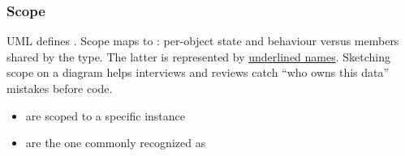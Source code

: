     \subsubsection{Scope}
    UML defines .
    \newline
    Scope maps to : per-object state and behaviour versus members shared by the type.
    The latter is represented by \underline{underlined names}.
    Sketching scope on a diagram helps interviews and reviews catch ``who owns this data'' mistakes before code.
    \begin{itemize}
        \item {} are scoped to a specific instance
        \item {} are the one commonly recognized as 
    \end{itemize}
